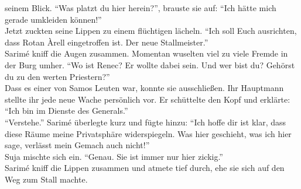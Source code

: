 seinem Blick. ``Was platzt du hier herein?'', brauste sie auf: ``Ich hätte mich gerade umkleiden 
können!''\\
Jetzt zuckten seine Lippen zu einem flüchtigen lächeln. ``Ich soll Euch ausrichten, dass Rotan 
Àrell eingetroffen ist. Der neue Stallmeister.''\\
Sarimé kniff die Augen zusammen. Momentan wuselten viel zu viele Fremde in der Burg umher. ``Wo ist 
Renec? Er wollte dabei sein. Und wer bist du? Gehörst du zu den werten Priestern?''\\
Dass es einer von Samos Leuten war, konnte sie ausschließen. Ihr Hauptmann stellte ihr jede neue 
Wache persönlich vor. Er schüttelte den Kopf und erklärte: ``Ich bin im Dienste des 
Generals.''\\
``Verstehe.'' Sarimé überlegte kurz und fügte hinzu: ``Ich hoffe dir ist klar, dass diese Räume 
meine Privatsphäre widerspiegeln. Was hier geschieht, was ich hier sage, verlässt mein Gemach auch 
nicht!''\\
Suja mischte sich ein. ``Genau. Sie ist immer nur hier zickig.''\\
Sarimé kniff die Lippen zusammen und atmete tief durch, ehe sie sich auf den Weg zum Stall machte.\\

